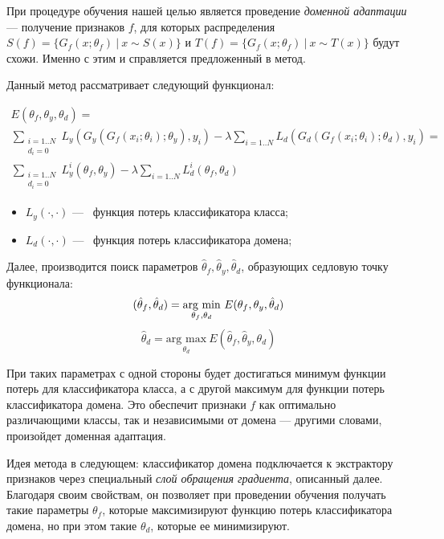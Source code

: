 \documentclass[14pt, a4paper]{extarticle}
\begin{document}
При процедуре обучения нашей целью является проведение \textit{доменной адаптации} — получение признаков $f$, для которых распределения $S(f) = \{G_f(x; \theta_f)~|~x \sim S(x) \}$ и $T(f) = \{G_f(x; \theta_f)~|~x \sim T(x) \}$ будут схожи. Именно с этим и справляется предложенный в \cite{ganin} метод.

Данный метод рассматривает следующий функционал:

\begin{equation}\label{E}
\begin{gathered}
E(\theta_f, \theta_y, \theta_d) = \\ \sum_{ \substack{i=1..N \\ d_i=0} }L_y(G_y(G_f(x_i; \theta_i); \theta_y), y_i) - \lambda \sum_{ i=1..N } L_d(G_d(G_f(x_i; \theta_i); \theta_d), y_i) = \\\sum_{ \substack{i=1..N \\ d_i=0} } L_y^i(\theta_f, \theta_y) - \lambda \sum_{ i=1..N }  L_d^i(\theta_f, \theta_d)
\end{gathered}
\end{equation}
\begin{itemize}
\item $L_y(·, ·)$ —~ функция потерь классификатора класса;
\item $L_d(·, ·)$ —~ функция потерь классификатора домена;
\end{itemize}

Далее, производится поиск параметров $\hat \theta_f, \hat \theta_y, \hat \theta_d$, образующих седловую точку функционала:
\begin{equation*}
	(\hat \theta_f, \hat \theta_d) = \underset{\theta_f, \theta_d}{\text{arg~min}}~E(\theta_f, \theta_y, \hat \theta_d) \\
\end{equation*}
\begin{equation*}
	\hat \theta_d = \underset{\theta_d}{\text{arg~max}}~E(\hat \theta_f, \hat \theta_y, \theta_d)
\end{equation*}

При таких параметрах с одной стороны будет достигаться минимум функции потерь для классификатора класса, а с другой максимум для функции потерь классификатора домена. Это обеспечит признаки $f$ как оптимально различающими классы, так и независимыми от домена — другими словами, произойдет доменная адаптация.

Идея метода в следующем: классификатор домена подключается к экстрактору признаков через специальный \textit{слой обращения градиента}, описанный далее. Благодаря своим свойствам, он позволяет при проведении обучения получать такие параметры $\theta_f$, которые максимизируют функцию потерь классификатора домена, но при этом такие $\theta_d$, которые ее минимизируют.
\end{document}
